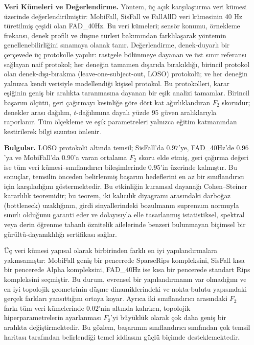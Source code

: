 \vspace{2mm}
\noindent\textbf{Veri Kümeleri ve Değerlendirme.}
Yöntem, üç açık karşılaştırma veri kümesi üzerinde değerlendirilmiştir: MobiFall,
SisFall ve FallAllD veri kümesinin 40 Hz türetilmiş çeşidi olan FAD\_40Hz. Bu veri
kümeleri; sensör konumu, örnekleme frekansı, denek profili ve düşme türleri bakımından
farklılaşarak yöntemin genellenebilirliğini sınamaya olanak tanır. Değerlendirme,
denek-duyarlı bir çerçevede üç protokolle yapılır: rastgele bölünmeye dayanan ve üst
sınır referansı sağlayan naif protokol; her deneğin tamamen dışarıda bırakıldığı,
birincil protokol olan denek-dışı-bırakma (leave-one-subject-out, LOSO) protokolü; ve
her deneğin yalnızca kendi verisiyle modellendiği kişisel protokol. Bu protokolleri,
karar eşiğinin geniş bir aralıkta taranmasına dayanan bir eşik analizi tamamlar. Birincil
başarım ölçütü, geri çağırmayı kesinliğe göre dört kat ağırlıklandıran $F_2$ skorudur;
denekler arası dağılım, $t$-dağılımına dayalı yüzde 95 güven aralıklarıyla raporlanır.
Tüm ölçekleme ve eşik parametreleri yalnızca eğitim katmanından kestirilerek bilgi
sızıntısı önlenir.

\vspace{2mm}
\noindent\textbf{Bulgular.}
LOSO protokolü altında temsil; SisFall'da $0.97$'ye, FAD\_40Hz'de $0.96$'ya ve
MobiFall'da $0.90$'a varan ortalama $F_2$ skoru elde etmiş, geri çağırma değeri ise tüm
veri kümesi--sınıflandırıcı bileşimlerinde $0.95$'in üzerinde kalmıştır. Bu sonuçlar,
temsilin önceden belirlenmiş başarım hedeflerini en az bir sınıflandırıcı için
karşıladığını göstermektedir. Bu etkinliğin kuramsal dayanağı Cohen--Steiner kararlılık
teoremidir; bu teorem, iki kalıcılık diyagramı arasındaki darboğaz (bottleneck)
uzaklığının, girdi sinyallerindeki bozulmanın supremum normuyla sınırlı olduğunu garanti
eder ve dolayısıyla elle tasarlanmış istatistiksel, spektral veya derin öğrenme tabanlı
öznitelik ailelerinde benzeri bulunmayan biçimsel bir gürültü-dayanıklılığı sertifikası
sağlar.

Üç veri kümesi yapısal olarak birbirinden farklı en iyi yapılandırmalara yakınsamıştır:
MobiFall geniş bir pencerede SparseRips kompleksini, SisFall kısa bir pencerede Alpha
kompleksini, FAD\_40Hz ise kısa bir pencerede standart Rips kompleksini seçmiştir. Bu
durum, evrensel bir yapılandırmanın var olmadığını ve en iyi topolojik geometrinin
düşme dinamiklerindeki ve nokta-bulutu yapısındaki gerçek farkları yansıttığını ortaya
koyar. Ayrıca iki sınıflandırıcı arasındaki $F_2$ farkı tüm veri kümelerinde $0.02$'nin
altında kalırken, topolojik hiperparametrelerin ayarlanması $F_2$'yi büyüklük olarak çok
daha geniş bir aralıkta değiştirmektedir. Bu gözlem, başarımın sınıflandırıcı sınıfından
çok temsil haritası tarafından belirlendiği temel iddiasını güçlü biçimde
desteklemektedir.

